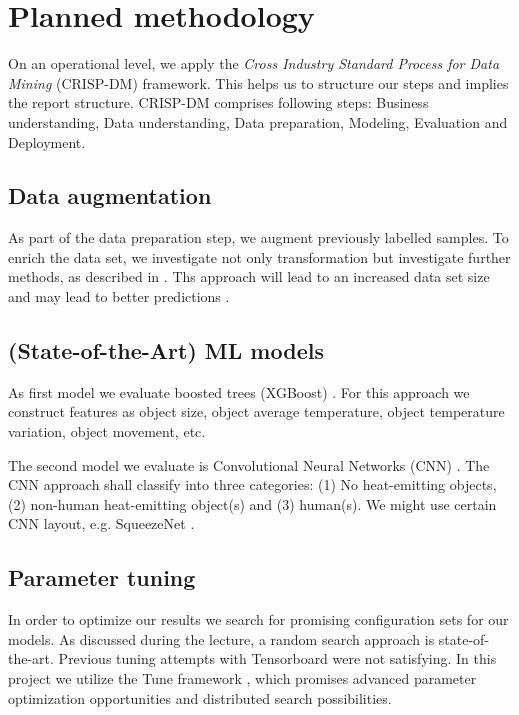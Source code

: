 \documentclass[10pt,letterpaper,conference]{IEEEtran}
\begin{document}
\section{Planned methodology}
On an operational level, we apply the \textit{Cross Industry Standard Process for Data Mining} (CRISP-DM) \cite{wirth2000crisp} framework.
This helps us to structure our steps and implies the report structure.
CRISP-DM comprises following steps:
Business understanding, Data understanding, Data preparation, Modeling, Evaluation and Deployment.

\subsection{Data augmentation}
As part of the data preparation step, we augment previously labelled samples.
To enrich the data set, we investigate not only transformation but investigate further methods, as described in \cite{shorten2019survey}.
Ths approach will lead to an increased data set size and may lead to better predictions \cite{perez2017effectiveness}.

\subsection{(State-of-the-Art) ML models}
As first model we evaluate boosted trees (XGBoost) \cite{chen2016xgboost}.
For this approach we construct features as object size, object average temperature, object temperature variation, object movement, etc.

The second model we evaluate is Convolutional Neural Networks (CNN) \cite{lecun1995convolutional}.
The CNN approach shall classify into three categories: (1) No heat-emitting objects, (2) non-human heat-emitting object(s) and (3) human(s).
We might use certain CNN layout, e.g. SqueezeNet \cite{SqueezeNet}.

\subsection{Parameter tuning}
In order to optimize our results we search for promising configuration sets for our models. As discussed during the lecture, a random search approach \cite{bergstra2012random} is state-of-the-art. Previous tuning attempts with Tensorboard were not satisfying. In this project we utilize the Tune framework \cite{liaw2018tune}, which promises advanced parameter optimization opportunities and distributed search possibilities.




\end{document}
